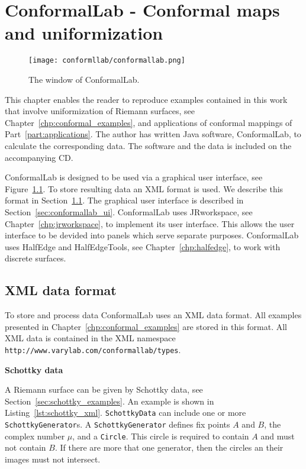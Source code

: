 \documentclass[Thesis.tex]{subfiles}
\begin{document}
\chapter{{\sc ConformalLab} - Conformal maps and uniformization}
\label{chp:conformallab}

\begin{figure}
\centering
\texttt{[image: conformllab/conformallab.png]}
\caption{The window of {\sc ConformalLab}.}
\label{fig:conformal_window}
\end{figure}

This chapter enables the reader to reproduce examples contained in this work
that involve uniformization of Riemann surfaces, see
Chapter~\ref{chp:conformal_examples}, and applications of conformal mappings of
Part~\ref{part:applications}. The author has written {\sc Java} software, {\sc
ConformalLab}, to calculate the corresponding data.  The software and the data
is included on the accompanying CD. 

{\sc ConformalLab} is designed to be used via a graphical user interface, see
Figure~\ref{fig:conformal_window}. To store resulting data an XML format is
used. We describe this format in Section~\ref{sec:conformal_data}. The
graphical user interface is described in Section~\ref{sec:conformallab_ui}.
{\sc ConformalLab} uses {\sc JRworkspace}, see Chapter~\ref{chp:jrworkspace},
to implement its user interface. This allows the user interface to be devided
into panels which serve separate purposes.  {\sc ConformalLab} uses {\sc
HalfEdge} and {\sc HalfEdgeTools}, see Chapter~\ref{chp:halfedge}, to work with
discrete surfaces.


\section{XML data format}
\label{sec:conformal_data}
To store and process data {\sc ConformalLab} uses an {\sc XML} data format.
All examples presented in Chapter~\ref{chp:conformal_examples} are stored in
this format.  All XML data is contained in the XML namespace {\tt
http://www.varylab.com/conformallab/types}.


{\bf Schottky data} 

A Riemann surface can be given by Schottky data, see
Section~\ref{sec:schottky_examples}. An example is shown in
Listing~\ref{lst:schottky_xml}. {\tt SchottkyData} can include one or more {\tt
SchottkyGenerator}s. A {\tt SchottkyGenerator} defines fix points $A$ and
$B$, the complex number $\mu$, and a {\tt Circle}. This circle is required to
contain $A$ and must not contain $B$. If there are more that one generator,
then the circles an their images must not intersect.
\end{document}
